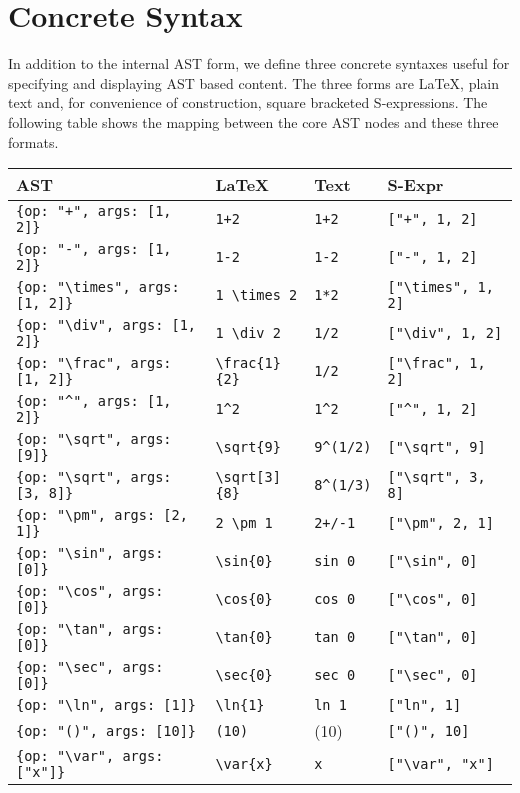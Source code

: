 \documentclass{article}
\newcommand{\var}[1]{\emph{#1}}
\begin{document}
\section{Concrete Syntax}

In addition to the internal AST form, we define three concrete syntaxes useful for specifying 
and displaying AST based content. The three forms are LaTeX, plain text and, for convenience of
construction, square bracketed S-expressions. The following table shows the mapping between the
core AST nodes and these three formats.\\

    \begin{tabular}{ | l | l | l | l |}
    \hline
    {\bf AST} & {\bf LaTeX} & {\bf Text} & {\bf S-Expr} \\ \hline
    \verb'{op: "+", args: [1, 2]}' & \verb'1+2' & \verb'1+2' & \verb'["+", 1, 2]'\\ \hline
    \verb'{op: "-", args: [1, 2]}' & \verb'1-2' & \verb'1-2' & \verb'["-", 1, 2]'\\ \hline
    \verb'{op: "\times", args: [1, 2]}' & \verb'1 \times 2' & \verb'1*2' & \verb'["\times", 1, 2]'\\ \hline
    \verb'{op: "\div", args: [1, 2]}' & \verb'1 \div 2' & \verb'1/2' & \verb'["\div", 1, 2]'\\ \hline
    \verb'{op: "\frac", args: [1, 2]}' & \verb'\frac{1}{2}' & \verb'1/2' & \verb'["\frac", 1, 2]'\\ \hline
    \verb'{op: "^", args: [1, 2]}' & \verb'1^2' & \verb'1^2' & \verb'["^", 1, 2]'\\ \hline
    \verb'{op: "\sqrt", args: [9]}' & \verb'\sqrt{9}' & \verb'9^(1/2)' & \verb'["\sqrt", 9]'\\ \hline
    \verb'{op: "\sqrt", args: [3, 8]}' & \verb'\sqrt[3]{8}' & \verb'8^(1/3)' & \verb'["\sqrt", 3, 8]'\\ \hline
    \verb'{op: "\pm", args: [2, 1]}' & \verb'2 \pm 1' & \verb'2+/-1' & \verb'["\pm", 2, 1]'\\ \hline
    \verb'{op: "\sin", args: [0]}' & \verb'\sin{0}' & \verb'sin 0' & \verb'["\sin", 0]'\\ \hline
    \verb'{op: "\cos", args: [0]}' & \verb'\cos{0}' & \verb'cos 0' & \verb'["\cos", 0]'\\ \hline
    \verb'{op: "\tan", args: [0]}' & \verb'\tan{0}' & \verb'tan 0' & \verb'["\tan", 0]'\\ \hline
    \verb'{op: "\sec", args: [0]}' & \verb'\sec{0}' & \verb'sec 0' & \verb'["\sec", 0]'\\ \hline
    \verb'{op: "\ln", args: [1]}' & \verb'\ln{1}' & \verb'ln 1' & \verb'["ln", 1]'\\ \hline
    \verb'{op: "()", args: [10]}' & \verb'(10)' & (10) & \verb'["()", 10]'\\ \hline
    \verb'{op: "\var", args: ["x"]}' & \verb'\var{x}' & \verb'x' & \verb'["\var", "x"]'\\ \hline
    \end{tabular}
\end{document}
